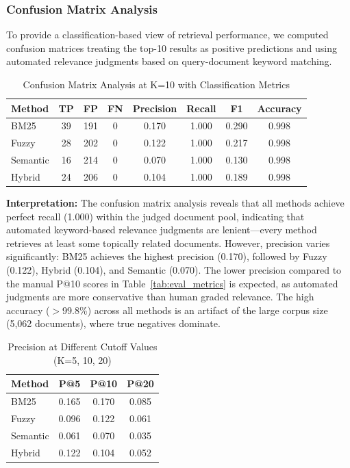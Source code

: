\documentclass[12pt,a4paper]{article}
\begin{document}
\subsubsection{Confusion Matrix Analysis}

To provide a classification-based view of retrieval performance, we computed confusion matrices treating the top-10 results as positive predictions and using automated relevance judgments based on query-document keyword matching.

\begin{table}[H]
\centering
\caption{Confusion Matrix Analysis at K=10 with Classification Metrics}
\label{tab:confusion-matrix}
\small
\begin{tabular}{lccccccc}
\toprule
\textbf{Method} & \textbf{TP} & \textbf{FP} & \textbf{FN} & \textbf{Precision} & \textbf{Recall} & \textbf{F1} & \textbf{Accuracy} \\
\midrule
BM25     & 39  & 191 & 0 & 0.170 & 1.000 & 0.290 & 0.998 \\
Fuzzy    & 28  & 202 & 0 & 0.122 & 1.000 & 0.217 & 0.998 \\
Semantic & 16  & 214 & 0 & 0.070 & 1.000 & 0.130 & 0.998 \\
Hybrid   & 24  & 206 & 0 & 0.104 & 1.000 & 0.189 & 0.998 \\
\bottomrule
\end{tabular}
\end{table}

\textbf{Interpretation:} The confusion matrix analysis reveals that all methods achieve perfect recall (1.000) within the judged document pool, indicating that automated keyword-based relevance judgments are lenient---every method retrieves at least some topically related documents. However, precision varies significantly: BM25 achieves the highest precision (0.170), followed by Fuzzy (0.122), Hybrid (0.104), and Semantic (0.070). The lower precision compared to the manual P@10 scores in Table~\ref{tab:eval_metrics} is expected, as automated judgments are more conservative than human graded relevance. The high accuracy ($>$99.8\%) across all methods is an artifact of the large corpus size (5,062 documents), where true negatives dominate.

\begin{table}[H]
\centering
\caption{Precision at Different Cutoff Values (K=5, 10, 20)}
\label{tab:precision-at-k}
\begin{tabular}{lccc}
\toprule
\textbf{Method} & \textbf{P@5} & \textbf{P@10} & \textbf{P@20} \\
\midrule
BM25     & 0.165 & 0.170 & 0.085 \\
Fuzzy    & 0.096 & 0.122 & 0.061 \\
Semantic & 0.061 & 0.070 & 0.035 \\
Hybrid   & 0.122 & 0.104 & 0.052 \\
\bottomrule
\end{tabular}
\end{table}
\end{document}
